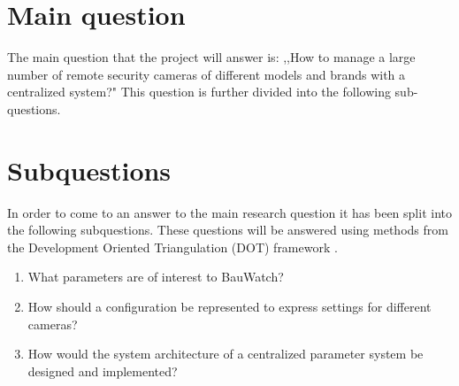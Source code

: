 
\section{Main question}
The main question that the project will answer is: ,,How to manage a large number of remote security cameras of different models and brands with a centralized system?"
This question is further divided into the following sub-questions.

\section{Subquestions}
In order to come to an answer to the main research question it has been split into the following subquestions.
These questions will be answered using methods from the Development Oriented Triangulation (DOT) framework \cite{noauthor_dot_nodate}.
\begin{enumerate}
	\item What parameters are of interest to BauWatch?
	\item How should a configuration be represented to express settings for different cameras?
	\item How would the system architecture of a centralized parameter system be designed and implemented?
\end{enumerate}

